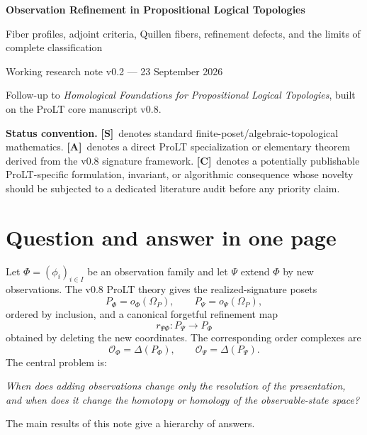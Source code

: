 \documentclass[11pt]{article}
\theoremstyle{definition}
\newcommand{\Om}{\Omega_P}
\newcommand{\OX}{\mathcal O}
\newcommand{\statusS}{\textbf{[S]}}
\newcommand{\statusA}{\textbf{[A]}}
\newcommand{\statusC}{\textbf{[C]}}
\begin{document}
\begin{center}
{\LARGE\bfseries\color{navy} Observation Refinement in Propositional Logical Topologies}\par
\vspace{0.3em}
{\large Fiber profiles, adjoint criteria, Quillen fibers, refinement defects, and the limits of complete classification}\par
\vspace{0.65em}
{\normalsize Working research note v0.2 --- 23 September 2026}\par
\vspace{0.3em}
{\small Follow-up to \emph{Homological Foundations for Propositional Logical Topologies}, built on the ProLT core manuscript v0.8.}
\end{center}

\vspace{0.7em}
\noindent\colorbox{softgold}{\parbox{0.96\textwidth}{
\textbf{Status convention.} \statusS\ denotes standard finite-poset/algebraic-topological mathematics. \statusA\ denotes a direct ProLT specialization or elementary theorem derived from the v0.8 signature framework. \statusC\ denotes a potentially publishable ProLT-specific formulation, invariant, or algorithmic consequence whose novelty should be subjected to a dedicated literature audit before any priority claim.
}}

\section{Question and answer in one page}

Let \(\Phi=(\phi_i)_{i\in I}\) be an observation family and let \(\Psi\) extend \(\Phi\) by new observations. The v0.8 ProLT theory gives the realized-signature posets
\[
P_\Phi=o_\Phi(\Om),\qquad P_\Psi=o_\Psi(\Om),
\]
ordered by inclusion, and a canonical forgetful refinement map
\[
r_{\Psi\Phi}:P_\Psi\longrightarrow P_\Phi
\]
obtained by deleting the new coordinates. The corresponding order complexes are
\[
\OX_\Phi=\Delta(P_\Phi),\qquad \OX_\Psi=\Delta(P_\Psi).
\]
The central problem is:

\begin{center}
\emph{When does adding observations change only the resolution of the presentation, and when does it change the homotopy or homology of the observable-state space?}
\end{center}

The main results of this note give a hierarchy of answers.
\end{document}
